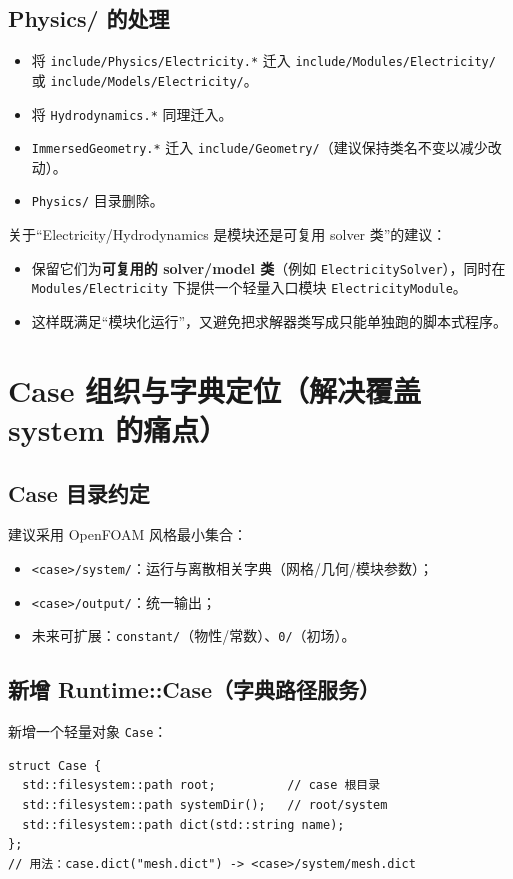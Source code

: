 \documentclass[UTF8,a4paper,11pt]{ctexart}
\begin{document}
\subsection{Physics/ 的处理}
\begin{itemize}
  \item 将 \texttt{include/Physics/Electricity.*} 迁入 \texttt{include/Modules/Electricity/} 或 \texttt{include/Models/Electricity/}。
  \item 将 \texttt{Hydrodynamics.*} 同理迁入。
  \item \texttt{ImmersedGeometry.*} 迁入 \texttt{include/Geometry/}（建议保持类名不变以减少改动）。
  \item \texttt{Physics/} 目录删除。
\end{itemize}

关于“Electricity/Hydrodynamics 是模块还是可复用 solver 类”的建议：
\begin{itemize}
  \item 保留它们为\textbf{可复用的 solver/model 类}（例如 \texttt{ElectricitySolver}），同时在 \texttt{Modules/Electricity} 下提供一个轻量入口模块 \texttt{ElectricityModule}。
  \item 这样既满足“模块化运行”，又避免把求解器类写成只能单独跑的脚本式程序。
\end{itemize}

\section{Case 组织与字典定位（解决覆盖 system 的痛点）}

\subsection{Case 目录约定}
建议采用 OpenFOAM 风格最小集合：
\begin{itemize}
  \item \texttt{<case>/system/}：运行与离散相关字典（网格/几何/模块参数）；
  \item \texttt{<case>/output/}：统一输出；
  \item 未来可扩展：\texttt{constant/}（物性/常数）、\texttt{0/}（初场）。
\end{itemize}

\subsection{新增 Runtime::Case（字典路径服务）}
新增一个轻量对象 \texttt{Case}：
\begin{lstlisting}
struct Case {
  std::filesystem::path root;          // case 根目录
  std::filesystem::path systemDir();   // root/system
  std::filesystem::path dict(std::string name);
};
// 用法：case.dict("mesh.dict") -> <case>/system/mesh.dict
\end{lstlisting}
\end{document}
